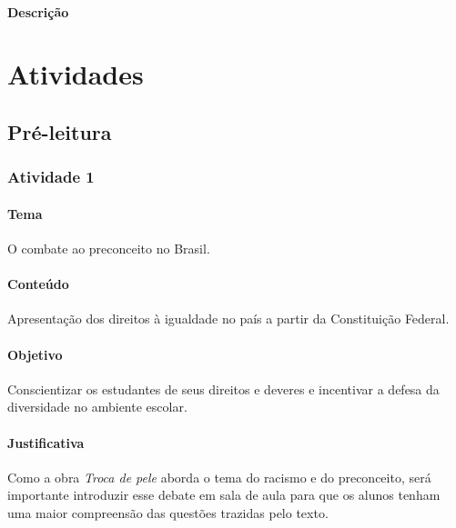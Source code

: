 \documentclass[11pt]{extarticle}
\begin{document}
\paragraph{Descrição} 

\section{Atividades}

\subsection{Pré-leitura}


\subsubsection{Atividade 1}

\paragraph{Tema} O combate ao preconceito no Brasil.

\paragraph{Conteúdo} Apresentação dos direitos à igualdade no país a partir da Constituição Federal.

\paragraph{Objetivo} Conscientizar os estudantes de seus direitos e deveres e incentivar a defesa da diversidade no ambiente escolar.

\paragraph{Justificativa} Como a obra \textit{Troca de pele} aborda o tema do racismo e do preconceito, será importante introduzir esse debate em sala de aula para que os alunos tenham uma maior compreensão das questões trazidas pelo texto.
\end{document}
